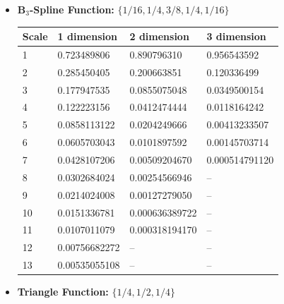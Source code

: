 \documentclass[12pt,a4paper]{article}
\begin{document}
\newpage
\begin{itemize}
\item \textbf{B$_3$-Spline Function:} $\{1/16,1/4,3/8,1/4,1/16\}$

\begin{tabular}{llll}
Scale & 1 dimension      & 2 dimension     & 3 dimension\\ \hline
1     & 0.723489806      & 0.890796310     & 0.956543592\\
2     & 0.285450405	 & 0.200663851	   & 0.120336499\\
3     & 0.177947535	 & 0.0855075048	   & 0.0349500154\\
4     & 0.122223156	 & 0.0412474444	   & 0.0118164242\\
5     & 0.0858113122	 & 0.0204249666	   & 0.00413233507\\
6     & 0.0605703043	 & 0.0101897592	   & 0.00145703714\\
7     & 0.0428107206	 & 0.00509204670   & 0.000514791120\\
8     & 0.0302684024	 & 0.00254566946   & --\\
9     & 0.0214024008	 & 0.00127279050   & --\\
10    & 0.0151336781	 & 0.000636389722  & --\\
11    & 0.0107011079	 & 0.000318194170  & --\\
12    & 0.00756682272	 & --		   & --\\
13    & 0.00535055108	 & --		   & --\\
\end{tabular}

\item \textbf{Triangle Function:} $\{1/4,1/2,1/4\}$


\end{itemize}
\end{document}
